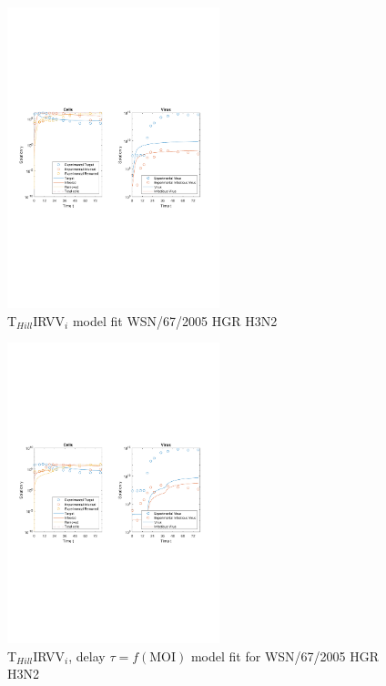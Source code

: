 \newpage

\begin{figure}[H]
\begin{center}
\includegraphics[width=0.55\textwidth, trim={1cm 9.8cm 1cm 9.5cm}, clip]{D_chapters/6_appendix/4_ValidationH3N2/InfectionDepletionModelTHillIRVViMOI0.002log.pdf}
\caption[T$_{Hill}$IRVV$_i$ model fit for WSN/67/2005 HGR H3N2]%
{T$_{Hill}$IRVV$_i$ model fit WSN/67/2005 HGR H3N2}
\label{figure:THillIRVViValidationRKI}
\end{center}
\end{figure}

\begin{figure}[H]
\begin{center}
\includegraphics[width=0.55\textwidth, trim={1cm 9.8cm 1cm 9.5cm}, clip]{D_chapters/6_appendix/4_ValidationH3N2/InfectionDepletionModelTHillIRVViDelayMOI0.002log.pdf}
\caption[T$_{Hill}$IRVV$_i$, delay $\tau = f(\text{MOI})$ model fit for WSN/67/2005 HGR H3N2]%
{T$_{Hill}$IRVV$_i$, delay $\tau = f(\text{MOI})$ model fit for WSN/67/2005 HGR H3N2}
\label{figure:THillIRVViDelayValidationRKI}
\end{center}
\end{figure}


